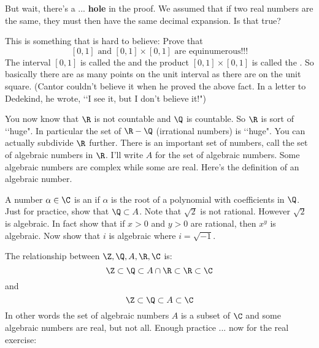 But wait, there's a ... \textbf{hole} in the proof. We assumed that if
two real numbers are the same, they must then have the same decimal
expansion. Is that true?








  This is something that is hard to believe:
  Prove that
  \[
  \text{$[0,1]$ and $[0,1] \times [0,1]$ are equinumerous!!!}
  \]
  The interval $[0,1]$ is called the 
  and the product $[0,1] \times [0,1]$ is called the .
  So basically there are as many points on the unit interval
  as there are on the unit square.
  (Cantor couldn't believe it when he proved the above fact.
  In a letter to Dedekind, he wrote,
  \lq\lq I see it, but I don’t believe it!")









You now know that $\R$ is not countable and $\Q$ is countable.
So $\R$ is sort of \lq\lq huge".
In particular the set of $\R - \Q$ (irrational numbers) is \lq\lq huge".
You can actually
subdivide $\R$ further.
There is an important set of numbers, call the
set of algebraic numbers in $\R$.
I'll write $A$ for the set of algebraic numbers.
Some algebraic numbers are complex while some are real.
Here's the definition of an algebraic number.

A number $\alpha \in \C$ is an 
if $\alpha$ is the root of a polynomial with coefficients in $\Q$.
Just for practice, show that $\Q \subset A$.
Note that $\sqrt{2}$ is not rational.
However $\sqrt{2}$ is algebraic.
In fact show that if $x > 0$ and $y > 0$ are rational, then
$x^y$ is algebraic.
Now show that $i$ is algebraic where $i = \sqrt{-1}$.

The relationship between $\Z, \Q, A, \R, \C$ is:
\[
\Z \subset \Q \subset A \cap \R \subset \R \subset \C
\]
and
\[
\Z \subset \Q \subset A \subset \C
\]
In other words the set of algebraic numbers $A$ is a subset of $\C$
and some algebraic numbers are real, but not all.
Enough practice ... now for the real exercise:



